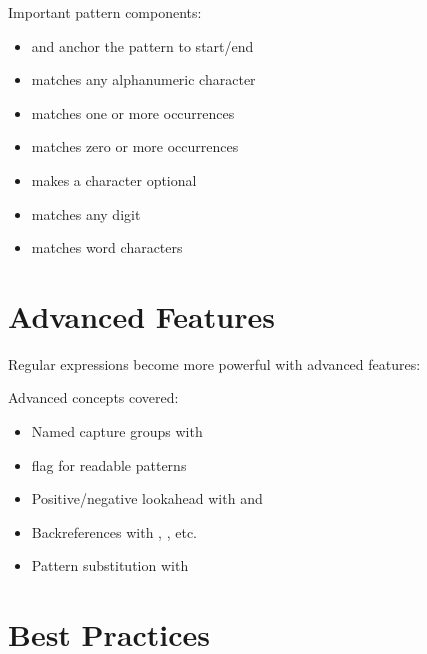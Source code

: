 \begin{macterminal}

\end{macterminal}

Important pattern components:
\begin{itemize}
    \item \code{\string^} and \code{\string$} anchor the pattern to start/end
    \item \code{[a-zA-Z0-9]} matches any alphanumeric character
    \item \code{+} matches one or more occurrences
    \item \code{*} matches zero or more occurrences
    \item {} makes a character optional
    \item {} matches any digit
    \item {} matches word characters
\end{itemize}

\section{Advanced Features}

Regular expressions become more powerful with advanced features:

\begin{macterminal}

\end{macterminal}

Advanced concepts covered:
\begin{itemize}
    \item Named capture groups with 
    \item {} flag for readable patterns
    \item Positive/negative lookahead with  and 
    \item Backreferences with , , etc.
    \item Pattern substitution with 
\end{itemize}

\section{Best Practices}

